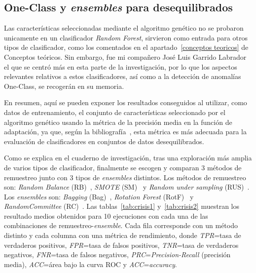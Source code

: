 \subsection{One-Class y \textit{ensembles} para desequilibrados}

Las características seleccionadas mediante el algoritmo genético no se probaron unicamente en un clasificador \textit{Random Forest}, sirvieron como entrada para otros tipos de clasificador, como los comentados en el apartado~\ref{conceptos teoricos} de Conceptos teóricos. Sin embargo, fue mi compañero José Luis Garrido Labrador el que se centró más en esta parte de la investigación, por lo que los aspectos relevantes relativos a estos clasificadores, así como a la detección de anomalías One-Class, se recogerán en su memoria. 

En resumen, aquí se pueden exponer los resultados conseguidos al utilizar, como datos de entrenamiento, el conjunto de características seleccionado por el algoritmo genético usando la métrica de la precisión media en la función de adaptación, ya que, según la bibliografía~\cite{Davis2006RPR, saito2015pr}, esta métrica es más adecuada para la evaluación de clasificadores en conjuntos de datos desequilibrados. 

Como se explica en el cuaderno de investigación, tras una exploración más amplia de varios tipos de clasificador, finalmente se escogen y comparan 3 métodos de remuestreo junto con 3 tipos de \textit{ensembles} distintos. Los métodos de remuestreo son: \textit{Random Balance} (RB)~\cite{diez2015random}, \textit{SMOTE} (SM)~\cite{galar2012review} y \textit{Random under sampling} (RUS)~\cite{diez2015diversity}. Los \textit{ensembles} son: \textit{Bagging} (Bag)~\cite{galar2012review}, \textit{Rotation Forest} (RotF)~\cite{rodriguez2006rotation} y \textit{RandomCommittee} (RC)~\cite{diez2015diversity}. Las tablas~\ref{tab:crisis1} y~\ref{tab:crisis2} muestran los resultado medios obtenidos para 10 ejecuciones con cada una de las combinaciones de remuestreo-\textit{ensemble}. Cada fila corresponde con un método distinto y cada columna con una métrica de rendimiento, donde \textit{TPR}=tasa de verdaderos positivos, \textit{FPR}=tasa de falsos positivos, \textit{TNR}=tasa de verdaderos negativos, \textit{FNR}=tasa de falsos negativos, \textit{PRC}=\textit{Precision-Recall} (precisión media), \textit{ACC}=área bajo la curva ROC y \textit{ACC}=\textit{accuracy}. 

